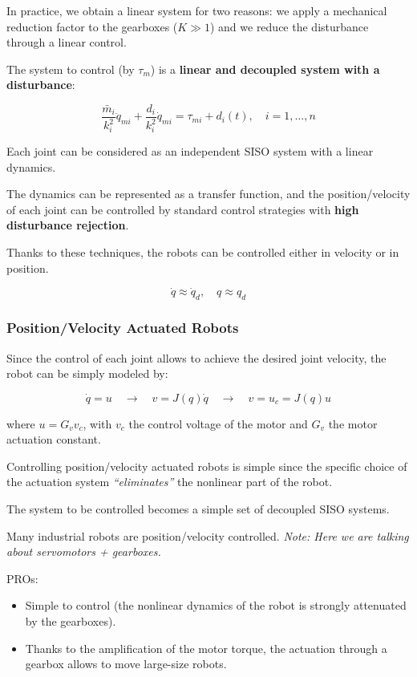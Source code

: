 In practice, we obtain a linear system for two reasons: we apply a mechanical reduction factor to the gearboxes ($K \gg 1$) and we reduce the disturbance through a linear control.

The system to control (by $\tau_m$) is a \textbf{linear and decoupled system with a disturbance}:

\[
\frac{\bar{m}_i}{k_i^2}\ddot{q}_{mi} + \frac{d_i}{k_i^2}\dot{q}_{mi} = \tau_{mi} + d_i(t), \quad i = 1,\dots,n
\]

Each joint can be considered as an independent SISO system with a linear dynamics.  

The dynamics can be represented as a transfer function, and the position/velocity of each joint can be controlled by standard control strategies with \textbf{high disturbance rejection}.  

Thanks to these techniques, the robots can be controlled either in velocity or in position.  

\[
\dot{q} \approx \dot{q}_d, \quad q \approx q_d
\]

\hfill

\subsubsection*{Position/Velocity Actuated Robots}

Since the control of each joint allows to achieve the desired joint velocity, the robot can be simply modeled by:

\[
\dot{q} = u 
\quad \longrightarrow \quad
v = J(q)\dot{q} 
\quad \longrightarrow \quad
v = u_c = J(q)u
\]

where $u = G_v v_c$, with $v_c$ the control voltage of the motor and $G_v$ the motor actuation constant.  

Controlling position/velocity actuated robots is simple since the specific choice of the actuation system \textit{“eliminates”} the nonlinear part of the robot.  

The system to be controlled becomes a simple set of decoupled SISO systems.

Many industrial robots are position/velocity controlled. \textit{Note: Here we are talking about servomotors + gearboxes.} 

PROs:
\begin{itemize}
    \item Simple to control (the nonlinear dynamics of the robot is strongly attenuated by the gearboxes).  
    \item Thanks to the amplification of the motor torque, the actuation through a gearbox allows to move large-size robots.  
\end{itemize}

